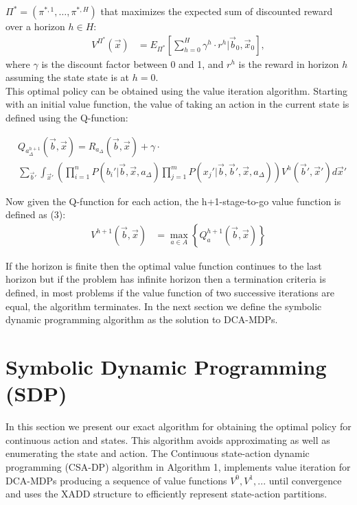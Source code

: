 \documentclass[letterpaper]{article}
\begin{document}
$\Pi^* = (\pi^{*,1},\ldots,\pi^{*,H})$ that maximizes the expected sum of discounted reward over a horizon $h \in H $: \\
\begin{align}
V^{\Pi^*}(\vec{x}) & = E_{\Pi^*} \left[ \sum_{h=0}^{H} \gamma^h \cdot r^h \Big| \vec{b}_0,\vec{x}_0 \right], \label{eq:vfun_def}
\end{align}
where $\gamma$ is the discount factor between 0 and 1, and  $r^h$ is the reward in horizon $h$ assuming the state state is at $h=0$.\\
This optimal policy can be obtained using the value iteration algorithm. Starting  with an initial value function, the value of taking an action in the current state is defined using the Q-function:  

\vspace{-3mm}

{\footnotesize
\begin{align}
& Q_{a_{\Delta}^{h+1}}(\vec{b},\vec{x}) = R_{a_{\Delta}}(\vec{b},\vec{x}) + \gamma \cdot \\ 
& \sum_{\vec{b}'} \int_{\vec{x}'} \left( \prod_{i=1}^n P(b_i'|\vec{b},\vec{x},a_{\Delta}) \prod_{j=1}^m P(x_j'|\vec{b},\vec{b}',\vec{x},a_{\Delta}) \right) V^h(\vec{b}',\vec{x}') d\vec{x}' \nonumber
\end{align}
}

Now given the Q-function for each action, the h+1-stage-to-go value function is defined as (3): 
\begin{align}
V^{h+1}(\vec{b},\vec{x}) & = \max_{a \in A} \left\{ Q^{h+1}_a(\vec{b},\vec{x}) \right\} \label{eq:vfun}
\end{align}

If the horizon is finite then the optimal value function continues to the last horizon but if the problem has infinite horizon then a termination criteria is defined, in most problems if the value function of two successive iterations are equal, the algorithm terminates. In the next section we define the symbolic dynamic programming algorithm as the solution to DCA-MDPs.

\section{Symbolic Dynamic Programming (SDP)}

In this section we present our exact algorithm for obtaining the optimal policy for continuous action and states. This algorithm avoids approximating as well as enumerating the state and action. The Continuous state-action dynamic programming (CSA-DP) algorithm in Algorithm 1, implements value iteration for DCA-MDPs producing a sequence of value functions $V^0,V^1,...$ until convergence and uses the XADD structure to efficiently represent state-action partitions.
\end{document}
